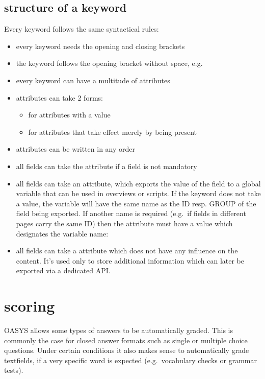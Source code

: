 \documentclass[12pt]{article} %
\begin{document}
\subsection{structure of a keyword}\label{subsec:structure-of-a-keyword}
Every keyword follows the same syntactical rules:
\begin{itemize}
\item every keyword needs the opening and closing brackets \kw{[@ ... @]}
\item the keyword follows the opening bracket without space, e.g. \kw{[@TF ... @]}
\item every keyword can have a multitude of attributes
\item attributes can take 2 forms:\begin{itemize}
	\item[]  for attributes with a value
	\item[]  for attributes that take effect merely by being present
\end{itemize}
\item attributes can be written in any order
\item all fields can take the attribute  if a field is not mandatory
\item all fields can take an  attribute, which exports the value of the field to a global variable that can be used in overviews or scripts.
If the  keyword does not take a value, the variable will have the same name as the ID resp.
GROUP of the field being exported.
If another name is required (e.g.\ if fields in different pages carry the same ID) then the attribute must have a value which designates the variable name: 
\item all fields can take a  attribute which does not have any influence on the content.
It's used only to store additional information which can later be exported via a dedicated API\@.
\end{itemize}
\newpage

\section{scoring}\label{sec:scoring}

OASYS allows some types of answers to be automatically graded.
This is commonly the case for closed answer formats such as single or multiple choice questions.
Under certain conditions it also makes sense to automatically grade textfields, if a very specific word is expected (e.g.\ vocabulary checks or grammar tests). \\
\end{document}
